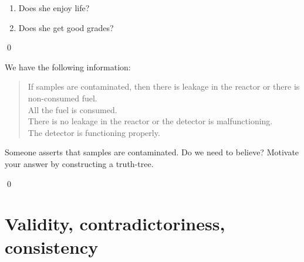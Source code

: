 \documentclass[11pt]{article}
\begin{document}
\begin{itemize}
\begin{uexercise}
\begin{enumerate}
\item Does she enjoy life?
\item Does she get good grades?
\end{enumerate}

\qed
\end{uexercise}
\hrulefill

\hrulefill
\begin{uexercise}\label{treeconsfol}
We have the following information:

\begin{quote}\small
If samples are contaminated, then there is leakage in the reactor or there is
non-consumed fuel.\\ 
All the fuel is consumed.\\
There is no leakage in the reactor or the detector is malfunctioning.\\
The detector is functioning properly.

\end{quote}

Someone asserts that samples are contaminated. Do we need to believe? Motivate
your answer by constructing a truth-tree.

\qed
\end{uexercise}
\hrulefill
\end{itemize}


\section{Validity, contradictoriness, consistency}

\end{document}
